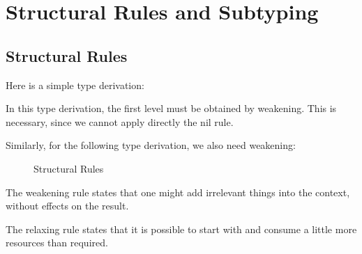 \documentclass[ manuscript,screen, nonacm]{acmart}
\begin{document}
\section{Structural Rules and Subtyping}
\subsection{Structural Rules}

\begin{example}

  Here is a simple type derivation:
 \begin{mathpar}
 \end{mathpar}
 In this type derivation, the first level must be obtained by weakening. This is necessary, since
 we cannot apply directly the nil rule.
 
 Similarly, for the following type derivation, we also need weakening:
 \begin{mathpar}
 \end{mathpar}

\end{example}

\begin{figure}
    \caption{Structural Rules}
    \label{fig:struct-rules}
\end{figure}
The weakening rule states that one might add irrelevant things into the context,
without effects on the result.

The relaxing rule states that it is possible to start with and consume a little more resources
than required.
\end{document}
